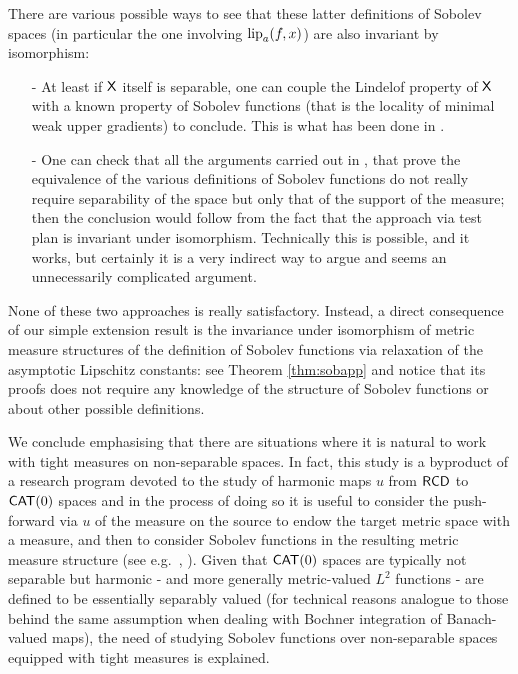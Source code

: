 \documentclass[9pt,reqno]{amsart}
\newcommand{\X}{{\sf X}}
\def\lipa#1#2{{\rm lip}_a (#1,#2)}
\begin{document}
\begin{itemize}
There are various possible ways to see that these latter definitions of Sobolev spaces (in particular the one involving $\lipa fx$) are also invariant by isomorphism:
\begin{itemize}
\item[-] At least if $\X$ itself is separable, one can couple the  Lindelof property of $\X$ with a known property of Sobolev functions  (that is the locality of minimal weak upper gradients) to conclude. This is what has been done in \cite{DMGSP18}.
\item[-] One can check that all the arguments carried out in \cite{AmbrosioGigliSavare11},  \cite{AmbrosioGigliSavare11-3} that prove the equivalence of the various definitions of Sobolev functions do not really require separability of the space but only that of the support of the measure; then the conclusion would follow from the fact that the approach via test plan is invariant under isomorphism. Technically this is possible, and it works, but certainly it is a very indirect way to argue and seems an unnecessarily complicated argument.
\end{itemize}
None of these two approaches is really satisfactory. Instead, a direct consequence of our simple extension result is the invariance under isomorphism of metric measure structures of the definition of Sobolev functions via relaxation of the asymptotic Lipschitz constants: see Theorem \ref{thm:sobapp} and notice that its proofs does not require any knowledge of the structure of Sobolev functions or about other possible definitions.

We conclude emphasising that there are situations where it is natural to work with tight measures on non-separable spaces. In fact, this study is a byproduct of a research program devoted to the study of harmonic maps $u$ from ${\sf RCD}$ to ${\sf CAT}(0)$ spaces and in the process of doing so it is useful to consider the push-forward via $u$ of the measure on the source to endow the target metric space with a measure, and then to consider Sobolev functions in the resulting metric measure structure (see e.g.\ \cite{GPS18}, \cite{GT18}). Given that ${\sf CAT}(0)$ spaces are typically not separable but harmonic - and more generally metric-valued $L^2$ functions  - are defined to be essentially separably valued (for technical reasons analogue to those behind the same assumption when dealing with Bochner integration of Banach-valued maps), the need of studying Sobolev functions over non-separable spaces equipped with tight measures is explained.



\end{itemize} 
\end{document}
